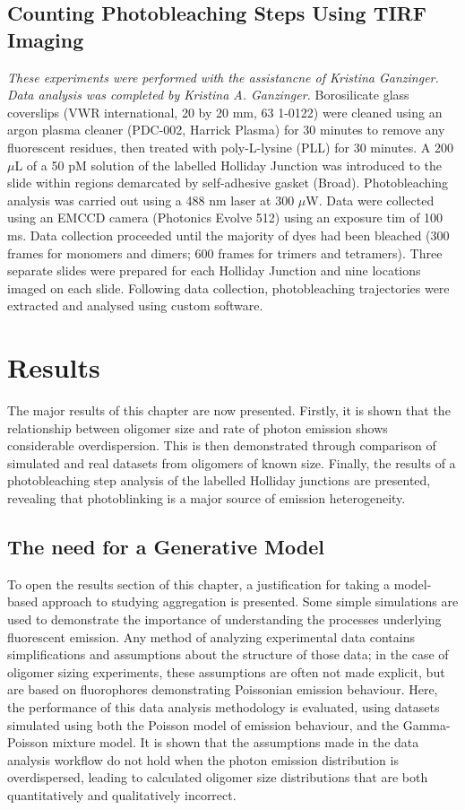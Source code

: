 \subsection{Counting Photobleaching Steps Using TIRF Imaging}
\label{tirf-photobleaching}
\textit{These experiments were performed with the assistancne of Kristina Ganzinger. Data analysis was completed by Kristina A. Ganzinger.}
Borosilicate glass coverslips (VWR international, 20 by 20 mm, 63 1-0122) were cleaned using an argon plasma cleaner (PDC-002, Harrick Plasma) for 30 minutes to remove any fluorescent residues, then treated with poly-L-lysine (PLL) for 30 minutes. A 200 $\mu$L of a 50 pM solution of the labelled Holliday Junction was introduced to the slide within regions demarcated by self-adhesive gasket (Broad). Photobleaching analysis was carried out using a 488 nm laser at 300 $\mu$W. Data were collected using an EMCCD camera (Photonics Evolve 512) using an exposure tim of 100 ms. Data collection proceeded until the majority of dyes had been bleached (300 frames for monomers and dimers; 600 frames for trimers and tetramers). Three separate slides were prepared for each Holliday Junction and nine locations imaged on each slide. Following data collection, photobleaching trajectories were extracted and analysed using custom software.

\section{Results}
The major results of this chapter are now presented. Firstly, it is shown that the relationship between oligomer size and rate of photon emission shows considerable overdispersion. This is then demonstrated through comparison of simulated and real datasets from oligomers of known size. Finally, the results of a photobleaching step analysis of the labelled Holliday junctions are presented, revealing that photoblinking is a major source of emission heterogeneity.

\subsection{The need for a Generative Model}
\label{sect:generative_model}
To open the results section of this chapter, a justification for taking a model-based approach to studying aggregation is presented. Some simple simulations are used to demonstrate the importance of understanding the processes underlying fluorescent emission. Any method of analyzing experimental data contains simplifications and assumptions about the structure of those data; in the case of oligomer sizing experiments, these assumptions are often not made explicit, but are based on fluorophores demonstrating Poissonian emission behaviour. Here, the performance of this data analysis methodology is evaluated, using datasets simulated using both the Poisson model of emission behaviour, and the Gamma-Poisson mixture model. It is shown that the assumptions made in the data analysis workflow do not hold when the photon emission distribution is overdispersed, leading to calculated oligomer size distributions that are both quantitatively and qualitatively incorrect. 

